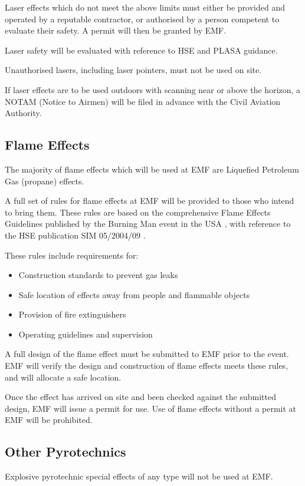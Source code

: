 Laser effects which do not meet the above limits must either be provided and
operated by a reputable contractor, or authorised by a person competent to
evaluate their safety. A permit will then be granted by EMF.

Laser safety will be evaluated with reference to HSE \cite{hselaser} and
PLASA \cite{plasalaser} guidance.

Unauthorised lasers, including laser pointers, must not be used on site.

If laser effects are to be used outdoors with scanning near or above the
horizon, a NOTAM (Notice to Airmen) will be filed in advance with the Civil
Aviation Authority.

\subsection{Flame Effects}\label{flameeffects}
The majority of flame effects which will be used at EMF are Liquefied Petroleum
Gas (propane) effects.

A full set of rules for flame effects at EMF will be provided to those
who intend to bring them. These rules are based on the comprehensive
Flame Effects Guidelines published by the Burning Man event in the USA \cite{bmflame},
with reference to the HSE publication SIM 05/2004/09 \cite{lpgsim}.

These rules include requirements for:
\begin{itemize}
    \tightlist
    \item Construction standards to prevent gas leaks
    \item Safe location of effects away from people and flammable objects
    \item Provision of fire extinguishers
    \item Operating guidelines and supervision
\end{itemize}

A full design of the flame effect must be submitted to EMF prior to the
event. EMF will verify the design and construction of flame effects meets
these rules, and will allocate a safe location.

Once the effect has arrived on site and been checked against the submitted
design, EMF will issue a permit for use. Use of flame effects without a
permit at EMF will be prohibited.

\subsection{Other Pyrotechnics}
Explosive pyrotechnic special effects of any type will not be used at EMF.

